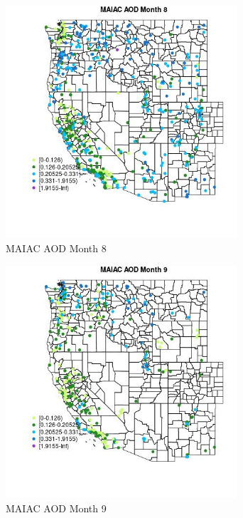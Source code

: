 \begin{figure} 
\centering  
\includegraphics[width=0.77\textwidth]{Code_Outputs/Report_ML_input_PM25_Step4_part_e_de_duplicated_aves_compiled_2019-05-18wNAs_MapObsMo8MAIAC_AOD.jpg} 
\caption{\label{fig:Report_ML_input_PM25_Step4_part_e_de_duplicated_aves_compiled_2019-05-18wNAsMapObsMo8MAIAC_AOD}MAIAC AOD Month 8} 
\end{figure} 
 

\begin{figure} 
\centering  
\includegraphics[width=0.77\textwidth]{Code_Outputs/Report_ML_input_PM25_Step4_part_e_de_duplicated_aves_compiled_2019-05-18wNAs_MapObsMo9MAIAC_AOD.jpg} 
\caption{\label{fig:Report_ML_input_PM25_Step4_part_e_de_duplicated_aves_compiled_2019-05-18wNAsMapObsMo9MAIAC_AOD}MAIAC AOD Month 9} 
\end{figure} 
 

